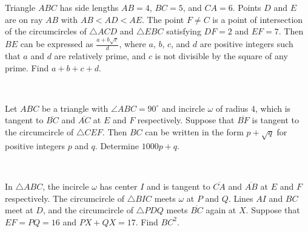 \documentclass{article}
\begin{document}
\begin{req}[AIME I 2019/13]{9}
Triangle $ABC$ has side lengths $AB=4$, $BC=5$, and $CA=6$. Points $D$ and $E$ are on ray $AB$ with $AB<AD<AE$. The point $F \neq C$ is a point of intersection of the circumcircles of $\triangle ACD$ and $\triangle EBC$ satisfying $DF=2$ and $EF=7$. Then $BE$ can be expressed as $\tfrac{a+b\sqrt{c}}{d}$, where $a$, $b$, $c$, and $d$ are positive integers such that $a$ and $d$ are relatively prime, and $c$ is not divisible by the square of any prime. Find $a+b+c+d$.
\end{req}\\
\begin{prob}{9}
Let $ABC$ be a triangle with $\angle ABC = 90^\circ$ and incircle $\omega$ of radius $4$, which is tangent to $\overline{BC}$ and $\overline{AC}$ at $E$ and $F$ respectively. Suppose that $\overline{BF}$ is tangent to the circumcircle of $\triangle CEF$. Then $BC$ can be written in the form $p + \sqrt{q}$ for positive integers $p$ and $q$. Determine $1000p + q$.
\end{prob}\\
\begin{prob}{13}
In $\triangle ABC$, the incircle $\omega$ has center $I$ and is tangent to $\overline{CA}$ and $\overline{AB}$ at $E$ and $F$ respectively. The circumcircle of $\triangle{BIC}$ meets $\omega$ at $P$ and $Q$. Lines $AI$ and $BC$ meet at $D$, and the circumcircle of $\triangle PDQ$ meets $\overline{BC}$ again at $X$. Suppose that $EF = PQ = 16$ and $PX + QX = 17$. Find $BC^2$.
\end{prob}
\end{document}
